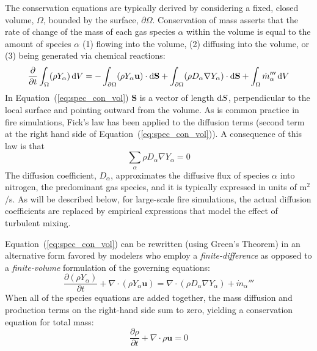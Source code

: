 \documentclass[graybox]{svmult}
\begin{document}
The conservation equations are typically derived by considering a fixed, closed volume, $\Omega$, bounded by the surface, $\partial \Omega$. Conservation of mass asserts that the rate of change of the mass of each gas species $\alpha$ within the volume is equal to the amount of species $\alpha$ (1) flowing into the volume, (2) diffusing into the volume, or (3) being generated via chemical reactions:
\begin{equation}
   \frac{ \partial }{\partial t} \int_\Omega  (\rho Y_\alpha) \, {\rm d}V = -\int_{\partial \Omega} (\rho Y_\alpha \mathbf{u}) \cdot {\rm d}{\mathbf S} + \int_{\partial \Omega} (\rho D_\alpha \nabla Y_\alpha) \cdot {\rm d}\mathbf{S} + \int_\Omega \dot{m}_\alpha''' \, {\rm d}V
   \label{eq:spec_con_vol}
\end{equation}
In Equation~(\ref{eq:spec_con_vol}) ${\mathbf S}$ is a vector of length ${\rm d}S$, perpendicular to the local surface and pointing outward from the volume. 
As is common practice in fire simulations, Fick's law has been applied to the diffusion terms (second term at the right hand side of Equation~(\ref{eq:spec_con_vol})). A consequence of this law is that
\begin{equation}
   \sum_\alpha \rho D_\alpha \nabla Y_\alpha = 0
\end{equation}
The diffusion coefficient, $D_\alpha$, approximates the diffusive flux of species $\alpha$ into nitrogen, the predominant gas species, and it is typically expressed in units of m$^2$/s. As will be described below, for large-scale fire simulations, the actual diffusion coefficients are replaced by empirical expressions that model the effect of turbulent mixing.

Equation~(\ref{eq:spec_con_vol}) can be rewritten (using Green's Theorem) in an alternative form favored by modelers who employ a {\em finite-difference} as opposed to a {\em finite-volume} formulation of the governing equations:
\begin{equation}
\frac{\partial (\rho Y_\alpha)}{\partial t} + \nabla \cdot (\rho Y_\alpha \mathbf{u}) = \nabla \cdot \left( \rho D_\alpha \nabla Y_\alpha \right) + \dot{m}_\alpha'''
\label{eq:speccon}
\end{equation}
When all of the species equations are added together, the mass diffusion and production terms on the right-hand side sum to zero, yielding a conservation equation for total mass:
\begin{equation}
\frac{\partial \rho}{\partial t} + \nabla \cdot \rho \mathbf{u} = 0
\label{eq:masscon}
\end{equation}
\end{document}
